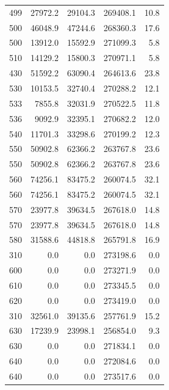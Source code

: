 \begin{longtable}{rrrrr}
    499 & \num{27972.2} & \num{29104.3} & \num{269408.1} & 10.8 \\
    500 & \num{46048.9} & \num{47244.6} & \num{268360.3} & 17.6 \\
    500 & \num{13912.0} & \num{15592.9} & \num{271099.3} & 5.8 \\
    510 & \num{14129.2} & \num{15800.3} & \num{270971.1} & 5.8 \\
    430 & \num{51592.2} & \num{63090.4} & \num{264613.6} & 23.8 \\
    530 & \num{10153.5} & \num{32740.4} & \num{270288.2} & 12.1 \\
    533 & \num{7855.8} & \num{32031.9} & \num{270522.5} & 11.8 \\
    536 & \num{9092.9} & \num{32395.1} & \num{270682.2} & 12.0 \\
    540 & \num{11701.3} & \num{33298.6} & \num{270199.2} & 12.3 \\
    550 & \num{50902.8} & \num{62366.2} & \num{263767.8} & 23.6 \\
    550 & \num{50902.8} & \num{62366.2} & \num{263767.8} & 23.6 \\
    560 & \num{74256.1} & \num{83475.2} & \num{260074.5} & 32.1 \\
    560 & \num{74256.1} & \num{83475.2} & \num{260074.5} & 32.1 \\
    570 & \num{23977.8} & \num{39634.5} & \num{267618.0} & 14.8 \\
    570 & \num{23977.8} & \num{39634.5} & \num{267618.0} & 14.8 \\
    580 & \num{31588.6} & \num{44818.8} & \num{265791.8} & 16.9 \\
    310 & \num{0.0} & \num{0.0} & \num{273198.6} & 0.0 \\
    600 & \num{0.0} & \num{0.0} & \num{273271.9} & 0.0 \\
    610 & \num{0.0} & \num{0.0} & \num{273345.5} & 0.0 \\
    620 & \num{0.0} & \num{0.0} & \num{273419.0} & 0.0 \\
    310 & \num{32561.0} & \num{39135.6} & \num{257761.9} & 15.2 \\
    630 & \num{17239.9} & \num{23998.1} & \num{256854.0} & 9.3 \\
    630 & \num{0.0} & \num{0.0} & \num{271834.1} & 0.0 \\
    640 & \num{0.0} & \num{0.0} & \num{272084.6} & 0.0 \\
    640 & \num{0.0} & \num{0.0} & \num{273517.6} & 0.0 \\

\end{longtable}
